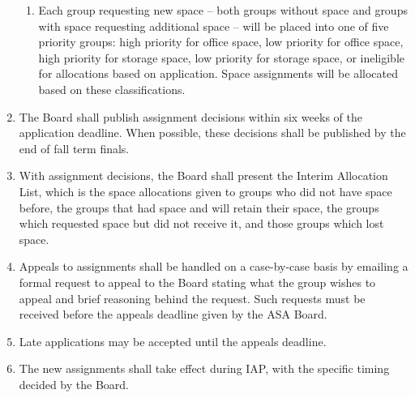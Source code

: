 \documentclass[12pt]{constitution}
\begin{document}
\begin{enumerate}
\begin{enumerate}
        \item \label{group_alloc_priority_groups} Each group requesting new space -- both groups
            without space and groups with space requesting additional space -- will be placed into
            one of five priority groups:
                high priority for office space, low priority for office space, high priority for storage space,
                low priority for storage space, or ineligible for allocations based on application.
            Space assignments will be allocated based on these classifications.
    \end{enumerate}

    \item The Board shall publish assignment decisions within six weeks of the application deadline.
    When possible, these decisions shall be published by the end of fall term finals.

    \item With assignment decisions, the Board shall present the Interim Allocation List, which is the
        space allocations given to groups who did not have space before, the groups that had
        space and will retain their space, the groups which requested space but did not receive it,
        and those groups which lost space.
    
    \item Appeals to assignments shall be handled on a case-by-case basis by emailing a formal request
        to appeal to the Board stating what the group wishes to appeal and brief reasoning behind
        the request.
    Such requests must be received before the appeals deadline given by the ASA Board.
    \item Late applications may be accepted until the appeals deadline.
    \item The new assignments shall take effect during IAP, with the specific timing decided by the Board.
\end{enumerate}
\end{document}
